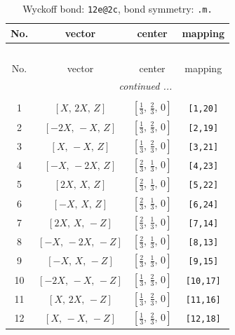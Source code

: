 \documentclass[fleqn,8pt]{jsarticle}
\begin{document}
\renewcommand{\arraystretch}{1.2}
\begin{longtable}{cccc}
\caption{Wyckoff bond: {\tt 12e@2c}, bond symmetry: {\tt .m.}}
 \\
 \hline \hline
No. & vector & center & mapping \\ \hline \endfirsthead

\multicolumn{3}{l}{\tablename\ \thetable{}} \\
 \hline \hline
No. & vector & center & mapping \\ \hline \endhead

 \hline \hline
\multicolumn{3}{r}{\footnotesize\it continued ...} \\ \endfoot

 \hline \hline
\multicolumn{3}{r}{} \\ \endlastfoot

1 & $\left[ X,\, 2 X,\, Z \right]$ & $\left[ \frac{1}{3},\, \frac{2}{3},\, 0 \right]$ & {\tt [1,20]} \\ \hline
2 & $\left[ - 2 X,\, - X,\, Z \right]$ & $\left[ \frac{1}{3},\, \frac{2}{3},\, 0 \right]$ & {\tt [2,19]} \\ \hline
3 & $\left[ X,\, - X,\, Z \right]$ & $\left[ \frac{1}{3},\, \frac{2}{3},\, 0 \right]$ & {\tt [3,21]} \\ \hline
4 & $\left[ - X,\, - 2 X,\, Z \right]$ & $\left[ \frac{2}{3},\, \frac{1}{3},\, 0 \right]$ & {\tt [4,23]} \\ \hline
5 & $\left[ 2 X,\, X,\, Z \right]$ & $\left[ \frac{2}{3},\, \frac{1}{3},\, 0 \right]$ & {\tt [5,22]} \\ \hline
6 & $\left[ - X,\, X,\, Z \right]$ & $\left[ \frac{2}{3},\, \frac{1}{3},\, 0 \right]$ & {\tt [6,24]} \\ \hline
7 & $\left[ 2 X,\, X,\, - Z \right]$ & $\left[ \frac{2}{3},\, \frac{1}{3},\, 0 \right]$ & {\tt [7,14]} \\ \hline
8 & $\left[ - X,\, - 2 X,\, - Z \right]$ & $\left[ \frac{2}{3},\, \frac{1}{3},\, 0 \right]$ & {\tt [8,13]} \\ \hline
9 & $\left[ - X,\, X,\, - Z \right]$ & $\left[ \frac{2}{3},\, \frac{1}{3},\, 0 \right]$ & {\tt [9,15]} \\ \hline
10 & $\left[ - 2 X,\, - X,\, - Z \right]$ & $\left[ \frac{1}{3},\, \frac{2}{3},\, 0 \right]$ & {\tt [10,17]} \\ \hline
11 & $\left[ X,\, 2 X,\, - Z \right]$ & $\left[ \frac{1}{3},\, \frac{2}{3},\, 0 \right]$ & {\tt [11,16]} \\ \hline
12 & $\left[ X,\, - X,\, - Z \right]$ & $\left[ \frac{1}{3},\, \frac{2}{3},\, 0 \right]$ & {\tt [12,18]} \\
\end{longtable}
\end{document}
